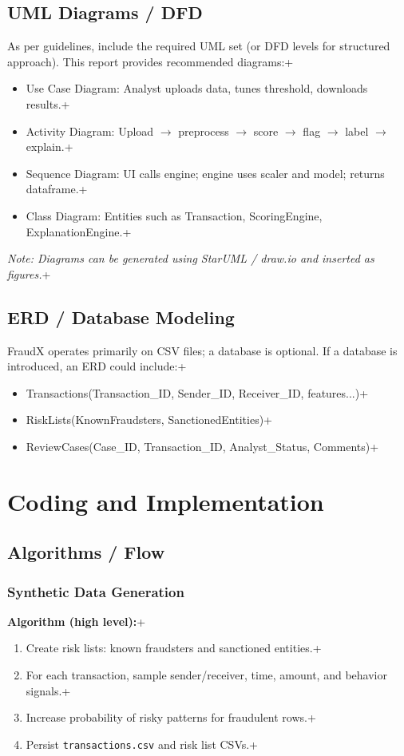 \documentclass[12pt,a4paper]{report}
\begin{document}
\section{UML Diagrams / DFD}
As per guidelines, include the required UML set (or DFD levels for structured approach). This report provides recommended diagrams:\n+\begin{itemize}
  \item Use Case Diagram: Analyst uploads data, tunes threshold, downloads results.\n+  \item Activity Diagram: Upload $\rightarrow$ preprocess $\rightarrow$ score $\rightarrow$ flag $\rightarrow$ label $\rightarrow$ explain.\n+  \item Sequence Diagram: UI calls engine; engine uses scaler and model; returns dataframe.\n+  \item Class Diagram: Entities such as Transaction, ScoringEngine, ExplanationEngine.\n+\end{itemize}
\textit{Note: Diagrams can be generated using StarUML / draw.io and inserted as figures.}\n+
\section{ERD / Database Modeling}
FraudX operates primarily on CSV files; a database is optional. If a database is introduced, an ERD could include:\n+\begin{itemize}
  \item Transactions(Transaction\_ID, Sender\_ID, Receiver\_ID, features...)\n+  \item RiskLists(KnownFraudsters, SanctionedEntities)\n+  \item ReviewCases(Case\_ID, Transaction\_ID, Analyst\_Status, Comments)\n+\end{itemize}

\chapter{Coding and Implementation}
\section{Algorithms / Flow}
\subsection{Synthetic Data Generation}
\textbf{Algorithm (high level):}\n+\begin{enumerate}
  \item Create risk lists: known fraudsters and sanctioned entities.\n+  \item For each transaction, sample sender/receiver, time, amount, and behavior signals.\n+  \item Increase probability of risky patterns for fraudulent rows.\n+  \item Persist \texttt{transactions.csv} and risk list CSVs.\n+\end{enumerate}
\end{document}
